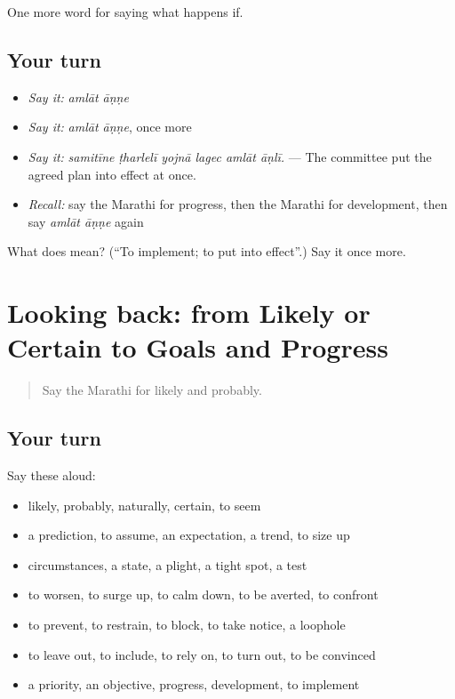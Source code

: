 \begin{grammarlens}[title={What you've built}]
One more word for saying what happens if.
\end{grammarlens}

\subsection*{Your turn}
\begin{itemize}
\raggedright
  \item \emph{Say it:} \emph{amlāt āṇṇe}
  \item \emph{Say it:} \emph{amlāt āṇṇe}, once more
  \item \emph{Say it:} \emph{samitīne ṭharlelī yojnā lagec amlāt āṇlī.} — The committee put the agreed plan into effect at once.
  \item \emph{Recall:} say the Marathi for progress, then the Marathi for development, then say \emph{amlāt āṇṇe} again
\end{itemize}

\begin{tcolorbox}[breakable,colback=teal!4,colframe=teal!35!black,title={Before you move on}]
What does   mean? (\textquotedblleft{}To implement; to put into effect\textquotedblright{}.) Say it once more.
\end{tcolorbox}
\section[(dialogue)]{Looking back: from Likely or Certain to Goals and Progress}

\label{lesson:MR-R388-review-382-388}



\begin{quote}
Say the Marathi for likely and probably.
\end{quote}

\subsection*{Your turn}
Say these aloud:

\begin{itemize}
\raggedright
  \item likely, probably, naturally, certain, to seem
  \item a prediction, to assume, an expectation, a trend, to size up
  \item circumstances, a state, a plight, a tight spot, a test
  \item to worsen, to surge up, to calm down, to be averted, to confront
  \item to prevent, to restrain, to block, to take notice, a loophole
  \item to leave out, to include, to rely on, to turn out, to be convinced
  \item a priority, an objective, progress, development, to implement
\end{itemize}

